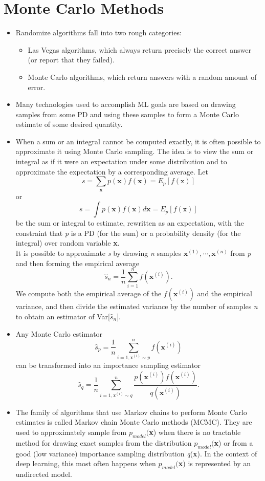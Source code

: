 \documentclass{article}
\begin{document}
\section{Monte Carlo Methods}
\begin{itemize}
\item Randomize algorithms fall into two rough categories:
\begin{itemize}
\item Las Vegas algorithms, which always return precisely the correct answer (or report that they failed).
\item Monte Carlo algorithms, which return answers with a random amount of error. 
\end{itemize}
\item Many technologies used to accomplish ML goals are based on drawing samples from some PD and using these samples to form a Monte Carlo estimate of some desired quantity.
\item When a sum or an integral cannot be computed exactly, it is often possible to approximate it using Monte Carlo sampling. The idea is to view the sum or integral as if it were an expectation under some distribution and to approximate the expectation by a corresponding average. Let 
\[
	s = \sum_{\boldsymbol{x}} p(\boldsymbol{x})f(\boldsymbol{x}) = E_p [f(\mathtt{x})]
\]
or
\[
	s = \int p(\boldsymbol{x})f(\boldsymbol{x})d\boldsymbol{x} = E_p [f(\mathtt{x})]
\]
be the sum or integral to estimate, rewritten as an expectation, with the constraint that \textit{p} is a PD (for the sum) or a probability density (for the integral) over random variable \textbf{x}.\\
It is possible to approximate \textit{s} by drawing \textit{n} samples \(\boldsymbol{x}^{(1)}, \cdots, \boldsymbol{x}^{(n)}\) from \textit{p} and then forming the empirical average
\[
	\hat{s}_n = \frac{1}{n} \sum_{i = 1}^{n} f(\boldsymbol{x}^{(i)}).
\]
We compute both the empirical average of the \(f(\boldsymbol{x}^{(i)})\) and the empirical variance, and then divide the estimated variance by the number of samples \textit{n} to obtain an estimator of Var[\(\hat{s}_n\)].
\item Any Monte Carlo estimator
\[
	\hat{s}_p = \frac{1}{n} \sum_{i = 1, \mathtt{x}^{(i)} \sim p}^n f(\boldsymbol{x}^{(i)})
\]
can be transformed into an importance sampling estimator
\[
	\hat{s}_q = \frac{1}{n} \sum_{i=1, \mathtt{x}^{(i)} \sim q}^n \frac{p(\boldsymbol{x}^{(i)})f(\boldsymbol{x}^{(i)})}{q(\boldsymbol{x}^{(i)})}.
\]
\item The family of algorithms that use Markov chains to perform Monte Carlo estimates is called Markov chain Monte Carlo methods (MCMC). They are used to approximately sample from \(p_{model}(\)\textbf{x}) when there is no tractable method for drawing exact samples from the distribution \(p_{model}(\)\textbf{x}) or from a good (low variance) importance sampling distribution \textit{q}(\textbf{x}). In the context of deep learning, this most often happens when \(p_{model}(\)\textbf{x}) is represented by an undirected model.

\end{itemize}
\end{document}
